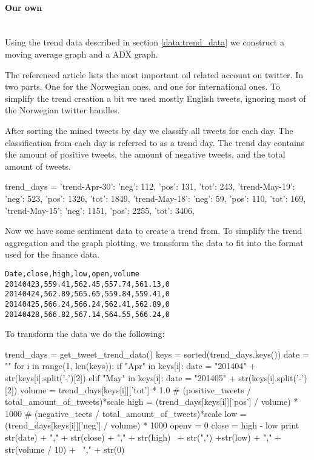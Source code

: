 \paragraph{Our own}
\hspace{0pt}\\
Using the trend data described in section \ref{data:trend_data} we construct a
moving average graph and a ADX graph. 

The referenced article lists the most important oil related account on twitter.
In two parts. One for the Norwegian ones, and one for international ones. 
To simplify the trend creation a bit we used mostly English tweets, ignoring
most of the Norwegian twitter handles. 

After sorting the mined tweets by day we classify all tweets for each day. The
classification from each day is referred to as a trend day. The trend day
contains the amount of positive tweets, the amount of negative tweets, and the
total amount of tweets.

\begin{python}
trend_days = {
	'trend-Apr-30': {'neg': 112, 'pos': 131, 'tot': 243},
    'trend-May-19': {'neg': 523, 'pos': 1326, 'tot': 1849},
    'trend-May-18': {'neg': 59, 'pos': 110, 'tot': 169},
    'trend-May-15': {'neg': 1151, 'pos': 2255, 'tot': 3406},
}
\end{python}  

Now we have some sentiment data to create a trend from. To simplify the trend
aggregation and the graph plotting, we transform the data to fit into the
format used for the finance data.  

\begin{verbatim}
Date,close,high,low,open,volume
20140423,559.41,562.45,557.74,561.13,0
20140424,562.89,565.65,559.84,559.41,0
20140425,566.24,566.24,562.41,562.89,0
20140428,566.82,567.14,564.55,566.24,0
\end{verbatim}

To transform the data we do the following: 
\begin{python}
trend_days = get_tweet_trend_data()
keys = sorted(trend_days.keys())
date = ""
for i in range(1, len(keys)):
    if "Apr" in keys[i]:
        date = "201404" + str(keys[i].split('-')[2])
    elif "May" in keys[i]:
        date = "201405" + str(keys[i].split('-')[2])
    volume = trend_days[keys[i]]['tot'] * 1.0
    # (positive_tweets / total_amount_of_tweets)*scale
    high = (trend_days[keys[i]]['pos'] / volume) * 1000
    # (negative_teets / total_amount_of_tweets)*scale
    low = (trend_days[keys[i]]['neg'] / volume) * 1000
    openv = 0
    close = high - low
    print str(date) + "," + str(close) + "," + str(high) \
          + str(",") +str(low) + "," + str(volume / 10) + \
          "," + str(0)
\end{python}

